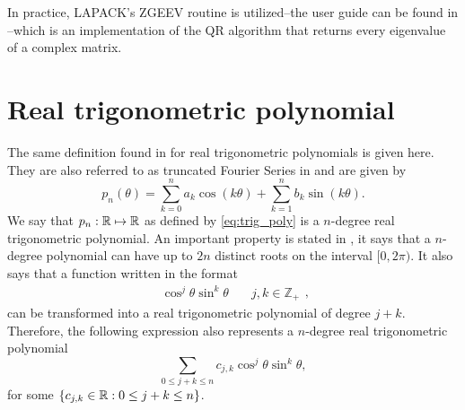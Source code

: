  In practice, LAPACK's ZGEEV routine is utilized--the user guide can be found in --which is an implementation of the QR algorithm that returns every eigenvalue of a complex matrix.
 
\section{Real trigonometric polynomial}

The same definition found in  for real trigonometric polynomials is given here. They are also referred to as truncated Fourier Series in  and are given by
\begin{equation}\label{eq:trig_poly}
p_n(\theta) = \sum_{k=0}^{n} a_k\cos(k\theta) + \sum_{k=1}^{n} b_k\sin(k\theta).
\end{equation}
We say that $p_n: \mathbb{R} \mapsto \mathbb{R}$ as defined by \autoref{eq:trig_poly} is a $n$-degree real trigonometric polynomial. An important property is stated in , it says that a $n$-degree polynomial can have up to $2n$ distinct roots on the interval $[0, 2\pi)$. It also says that a function written in the format
$$\begin{array}{cc}\cos^j{\theta}\sin^k{\theta} & \quad j, k \in \mathbb{Z}_+ \end{array},$$
can be transformed into a real trigonometric polynomial of degree $j+k$. Therefore, the following expression also represents a $n$-degree real trigonometric polynomial
\begin{equation}\label{eq:trig_poly_2}
\sum_{0 \le j+k \le n}c_{j,k}\cos^j{\theta}\sin^k{\theta},
\end{equation}
for some $\{c_{j,k} \in \mathbb{R}: 0 \le j+k \le n\}$.